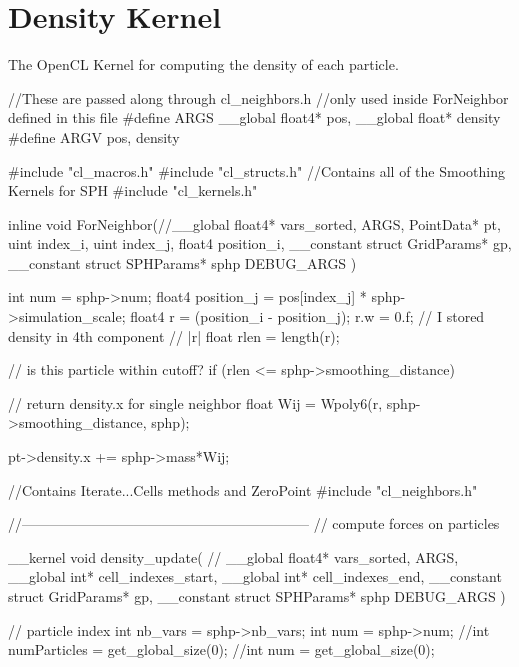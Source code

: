 \section{Density Kernel}
\label{appendix:density}
The OpenCL Kernel for computing the density of each particle.

\begin{cppcode}{0}
//These are passed along through cl_neighbors.h
//only used inside ForNeighbor defined in this file
#define ARGS __global float4* pos, __global float* density
#define ARGV pos, density
        
#include "cl_macros.h"
#include "cl_structs.h"
//Contains all of the Smoothing Kernels for SPH
#include "cl_kernels.h"
        
inline void ForNeighbor(//__global float4*  vars_sorted,
                        ARGS,
                        PointData* pt,
                        uint index_i,
                        uint index_j,
                        float4 position_i,
                        __constant struct GridParams* gp,
                        __constant struct SPHParams* sphp
                        DEBUG_ARGS
                       )
{
    int num = sphp->num;
    float4 position_j = pos[index_j] * sphp->simulation_scale; 
    float4 r = (position_i - position_j);
    r.w = 0.f; // I stored density in 4th component
    // |r|
    float rlen = length(r);

    // is this particle within cutoff?
    if (rlen <= sphp->smoothing_distance)
    {
        // return density.x for single neighbor
        float Wij = Wpoly6(r, sphp->smoothing_distance, sphp);

        pt->density.x += sphp->mass*Wij;
    }
}
//Contains Iterate...Cells methods and ZeroPoint
#include "cl_neighbors.h"

//--------------------------------------------------------------
// compute forces on particles

__kernel void density_update(
//                       __global float4* vars_sorted,
                       ARGS,
                       __global int*    cell_indexes_start,
                       __global int*    cell_indexes_end,
                       __constant struct GridParams* gp,
                       __constant struct SPHParams* sphp
                       DEBUG_ARGS
                       )
{
    // particle index
    int nb_vars = sphp->nb_vars;
    int num = sphp->num;
    //int numParticles = get_global_size(0);
    //int num = get_global_size(0);

}
\end{cppcode}
